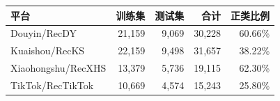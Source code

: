 \begin{tabular}{lrrrr}
\toprule
平台 & 训练集 & 测试集 & 合计 & 正类比例 \\
\midrule
Douyin/RecDY & 21,159 & 9,069 & 30,228 & 60.66\% \\
Kuaishou/RecKS & 22,159 & 9,498 & 31,657 & 38.22\% \\
Xiaohongshu/RecXHS & 13,379 & 5,736 & 19,115 & 62.30\% \\
TikTok/RecTikTok & 10,669 & 4,574 & 15,243 & 25.80\% \\
\bottomrule
\end{tabular}
